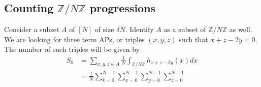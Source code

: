 \documentclass[12pt, titlepage]{article}
\theoremstyle{definition}
\newcommand{\znz}{\mathbb{Z}/N\mathbb{Z}}
\begin{document}
\subsection{Counting $\znz$ progressions}
Consider a subset $A$ of $[N]$ of size $\delta N$. Identify $A$ as a subset of $\znz$ as well. We are looking for three term APs, or triples $(x,y,z)$ such that $x+z - 2y = 0$. The number of such triples will be given by
\begin{align*}
    S_0 &= \sum_{x,y,z \in A} \frac{1}{N} \int_{\znz} h_{x+z-2y}(x) dx \\
    &= \frac{1}{N} \sum_{k=0}^{N-1} \sum_{x=0}^{N-1} \sum_{y=0}^{N-1} \sum_{z=0}^{N-1}
\end{align*}

\newpage




\end{document}
